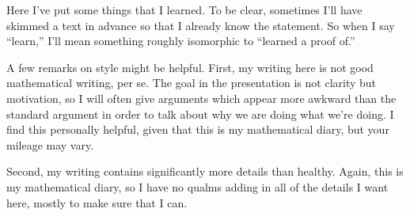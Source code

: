 Here I've put some things that I learned. To be clear, sometimes I'll have skimmed a text in advance so that I already know the statement. So when I say ``learn,'' I'll mean something roughly isomorphic to ``learned a proof of.''

A few remarks on style might be helpful. First, my writing here is not good mathematical writing, per se. The goal in the presentation is not clarity but motivation, so I will often give arguments which appear more awkward than the standard argument in order to talk about why we are doing what we're doing. I find this personally helpful, given that this is my mathematical diary, but your mileage may vary.

Second, my writing contains significantly more details than healthy. Again, this is my mathematical diary, so I have no qualms adding in all of the details I want here, mostly to make sure that I can.